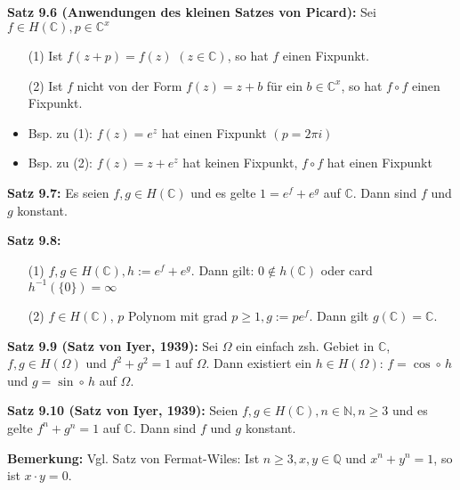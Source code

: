 \documentclass[11pt]{article}
\newcommand{\C}{\mathbb{C}}
\newcommand{\Q}{\mathbb{Q}}
\newcommand{\N}{\mathbb{N}}
\begin{document}
\textbf{Satz 9.6 (Anwendungen des kleinen Satzes von Picard):} Sei $f \in H(\C), p \in \C^x$
\vspace{-0.6cm}  
\begin{itemize}
\item[(1)] Ist $f(z + p) = f(z)$ $(z \in \C)$, so hat $f$ einen Fixpunkt. \vspace{-0.2cm}
\item[(2)] Ist $f$ nicht von der Form $f(z) = z + b$ für ein $b \in \C^x$, so hat $f \circ f$ einen Fixpunkt.
\end{itemize}
\vspace{-0.6cm} 

\vspace{-0.4cm}  
\begin{itemize}
\item Bsp. zu (1): $f(z) = e^z$ hat einen Fixpunkt $(p = 2 \pi i)$  \vspace{-0.2cm}
\item Bsp. zu (2): $f(z) = z + e^z$ hat keinen Fixpunkt, $f \circ f$ hat einen Fixpunkt
\end{itemize}
\vspace{-0.3cm} 

\textbf{Satz 9.7:} Es seien $f,g \in H(\C)$ und es gelte $1 = e^f + e^g$ auf $\C$. Dann sind $f$ und $g$ konstant. 

\textbf{Satz 9.8:} 
\vspace{-0.6cm}  
\begin{itemize}
\item[(1)] $f,g \in H(\C), h := e^f + e^g$. Dann gilt: $0 \notin h(\C)$ oder card $h^{-1} (\{ 0 \}) = \infty$  \vspace{-0.2cm}
\item[(2)] $f \in H(\C)$, $p$ Polynom mit grad $p \geq 1, g := pe^f$. Dann gilt $g(\C) = \C$.
\end{itemize}
\vspace{-0.3cm} 

\textbf{Satz 9.9 (Satz von Iyer, 1939):} Sei $\Omega$ ein einfach zsh. Gebiet in $\C$, $f,g \in H(\Omega)$ und $f^2 + g^2 = 1$ auf $\Omega$. Dann existiert ein $h \in H(\Omega)$: $f = \cos \circ \, h$ und $g = \sin \circ \, h$ auf $\Omega$.

\textbf{Satz 9.10 (Satz von Iyer, 1939):} Seien $f,g \in H(\C), n \in \N, n \geq 3$ und es gelte $f^n + g^n = 1$ auf $\C$. Dann sind $f$ und $g$ konstant. 

\textbf{Bemerkung:} Vgl. Satz von Fermat-Wiles: Ist $n \geq 3, x,y \in \Q$ und $x^n + y^n = 1$, so ist $x\cdot y = 0$.
\end{document}
